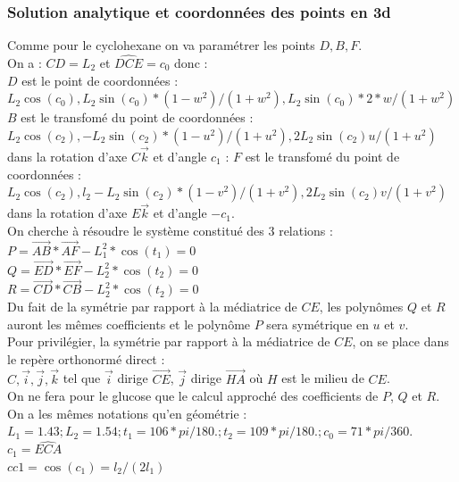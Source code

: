 \documentclass[a4paper,11pt]{book}
\begin{document}
\subsubsection{Solution analytique et coordonn\'ees des points en 3d}
Comme pour le cyclohexane on va param\'etrer les points $D,B,F$.\\
On a :
$CD=L_2$ et $\widehat{DCE}=c_0$ donc :\\
 $D$  est le point de coordonn\'ees :\\
$L_2\cos(c_0),L_2\sin(c_0)*(1-w^2)/(1+w^2),L_2\sin(c_0)*2*w/(1+w^2)$\\
$B$ est le transfom\'e du point  de coordonn\'ees :\\
$L_2\cos(c_2),-L_2\sin(c_2)*(1-u^2)/(1+u^2),2L_2\sin(c_2)u/(1+u^2)$ dans la 
rotation d'axe $C\overrightarrow{k}$ et d'angle $c_1$ :
$F$ est le transfom\'e du point  de coordonn\'ees :\\
$L_2\cos(c_2),l_2-L_2\sin(c_2)*(1-v^2)/(1+v^2),2L_2\sin(c_2)v/(1+v^2)$ dans la 
rotation d'axe $E\overrightarrow{k}$ et d'angle $-c_1$.\\
On cherche \`a r\'esoudre le syst\`eme constitu\'e des 3 relations :\\
$P=\overrightarrow{AB}*\overrightarrow{AF}-L_1^2*\cos(t_1)=0$\\
$Q=\overrightarrow{ED}*\overrightarrow{EF}-L_2^2*\cos(t_2)=0$\\
$R=\overrightarrow{CD}*\overrightarrow{CB}-L_2^2*\cos(t_2)=0$\\
Du fait de la sym\'etrie par rapport \`a la m\'ediatrice de $CE$, les 
polyn\^omes $Q$ et $R$ auront les m\^emes coefficients et le polyn\^ome $P$ sera
sym\'etrique en $u$ et $v$.\\
Pour privil\'egier, la sym\'etrie par rapport \`a la m\'ediatrice de $CE$, on se
place dans le rep\`ere orthonorm\'e direct :\\
$C,\overrightarrow{i},\overrightarrow{j},\overrightarrow{k}$ tel que 
$\overrightarrow{i}$ dirige $\overrightarrow{CE}$, $\overrightarrow{j}$ dirige 
$\overrightarrow{HA}$ o\`u $H$ est le milieu de $CE$.\\
On ne fera pour le glucose que le calcul approch\'e des coefficients de $P$,
 $Q$ et  $R$.\\ 
On a les m\^emes notations qu'en g\'eom\'etrie :\\
$L_1=1.43;L_2=1.54;t_1=106*pi/180.;t_2=109*pi/180.;c_0=71*pi/360.$\\
$c_1=\widehat{ECA}$\\
$cc1=\cos(c_1)=l_2/(2l_1)$\\
\end{document}
